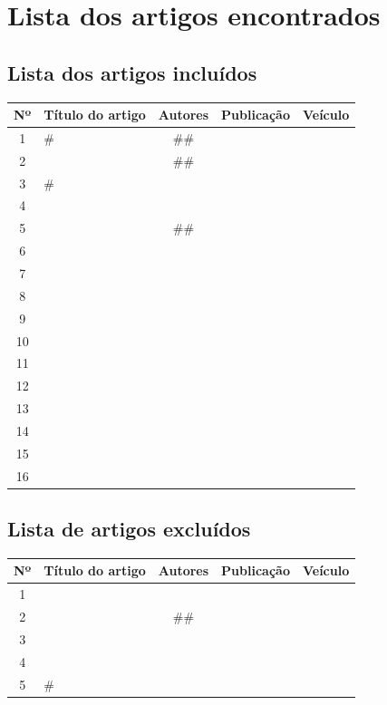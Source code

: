 \documentclass[12pt,a4paper]{article}
\begin{document}
\newpage
\section*{Lista dos artigos encontrados}
\subsection*{Lista dos artigos incluídos}

\begin{table}[h]
\centering
\begin{tabular}{|c|p{6cm}|c|c|c|}
\hline
\textbf{Nº} & \textbf{Título do artigo} & \textbf{Autores} & \textbf{Publicação} & \textbf{Veículo} \\
\hline
1 & \# & \#\# & & \\
\hline
2 & & \#\# & & \\
\hline
3 & \# & & & \\
\hline
4 & & & & \\
\hline
5 & & \#\# & & \\
\hline
6 & & & & \\
\hline
7 & & & & \\
\hline
8 & & & & \\
\hline
9 & & & & \\
\hline
10 & & & & \\
\hline
11 & & & & \\
\hline
12 & & & & \\
\hline
13 & & & & \\
\hline
14 & & & & \\
\hline
15 & & & & \\
\hline
16 & & & & \\
\hline
\end{tabular}
\end{table}

\subsection*{Lista de artigos excluídos}

\begin{table}[h]
\centering
\begin{tabular}{|c|p{6cm}|c|c|c|}
\hline
\textbf{Nº} & \textbf{Título do artigo} & \textbf{Autores} & \textbf{Publicação} & \textbf{Veículo} \\
\hline
1 & & & & \\
\hline
2 & & \#\# & & \\
\hline
3 & & & & \\
\hline
4 & & & & \\
\hline
5 & \# & & & \\
\hline
\end{tabular}
\end{table}
\end{document}
